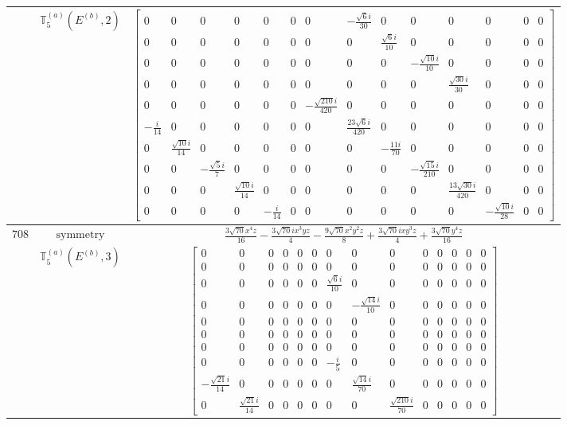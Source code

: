 \documentclass[fleqn,8pt,landscape]{jsarticle}
\begin{document}
\begin{longtable}{ccc}
$  $ & $ \mathbb{T}_{5}^{(a)}(E^{(b)},2) $ & $ \begin{bmatrix} 0 & 0 & 0 & 0 & 0 & 0 & 0 & - \frac{\sqrt{6} i}{30} & 0 & 0 & 0 & 0 & 0 & 0 \\ 0 & 0 & 0 & 0 & 0 & 0 & 0 & 0 & \frac{\sqrt{6} i}{10} & 0 & 0 & 0 & 0 & 0 \\ 0 & 0 & 0 & 0 & 0 & 0 & 0 & 0 & 0 & - \frac{\sqrt{10} i}{10} & 0 & 0 & 0 & 0 \\ 0 & 0 & 0 & 0 & 0 & 0 & 0 & 0 & 0 & 0 & \frac{\sqrt{30} i}{30} & 0 & 0 & 0 \\ 0 & 0 & 0 & 0 & 0 & 0 & - \frac{\sqrt{210} i}{420} & 0 & 0 & 0 & 0 & 0 & 0 & 0 \\ - \frac{i}{14} & 0 & 0 & 0 & 0 & 0 & 0 & \frac{23 \sqrt{6} i}{420} & 0 & 0 & 0 & 0 & 0 & 0 \\ 0 & \frac{\sqrt{10} i}{14} & 0 & 0 & 0 & 0 & 0 & 0 & - \frac{11 i}{70} & 0 & 0 & 0 & 0 & 0 \\ 0 & 0 & - \frac{\sqrt{5} i}{7} & 0 & 0 & 0 & 0 & 0 & 0 & - \frac{\sqrt{15} i}{210} & 0 & 0 & 0 & 0 \\ 0 & 0 & 0 & \frac{\sqrt{10} i}{14} & 0 & 0 & 0 & 0 & 0 & 0 & \frac{13 \sqrt{30} i}{420} & 0 & 0 & 0 \\ 0 & 0 & 0 & 0 & - \frac{i}{14} & 0 & 0 & 0 & 0 & 0 & 0 & - \frac{\sqrt{10} i}{28} & 0 & 0 \end{bmatrix} $ \\ \hline
$ 708 $ & $ \text{symmetry} $ & $ \frac{3 \sqrt{70} x^{4} z}{16} - \frac{3 \sqrt{70} i x^{3} y z}{4} - \frac{9 \sqrt{70} x^{2} y^{2} z}{8} + \frac{3 \sqrt{70} i x y^{3} z}{4} + \frac{3 \sqrt{70} y^{4} z}{16} $ \\
$  $ & $ \mathbb{T}_{5}^{(a)}(E^{(b)},3) $ & $ \begin{bmatrix} 0 & 0 & 0 & 0 & 0 & 0 & 0 & 0 & 0 & 0 & 0 & 0 & 0 & 0 \\ 0 & 0 & 0 & 0 & 0 & 0 & 0 & 0 & 0 & 0 & 0 & 0 & 0 & 0 \\ 0 & 0 & 0 & 0 & 0 & 0 & \frac{\sqrt{6} i}{10} & 0 & 0 & 0 & 0 & 0 & 0 & 0 \\ 0 & 0 & 0 & 0 & 0 & 0 & 0 & - \frac{\sqrt{14} i}{10} & 0 & 0 & 0 & 0 & 0 & 0 \\ 0 & 0 & 0 & 0 & 0 & 0 & 0 & 0 & 0 & 0 & 0 & 0 & 0 & 0 \\ 0 & 0 & 0 & 0 & 0 & 0 & 0 & 0 & 0 & 0 & 0 & 0 & 0 & 0 \\ 0 & 0 & 0 & 0 & 0 & 0 & 0 & 0 & 0 & 0 & 0 & 0 & 0 & 0 \\ 0 & 0 & 0 & 0 & 0 & 0 & - \frac{i}{5} & 0 & 0 & 0 & 0 & 0 & 0 & 0 \\ - \frac{\sqrt{21} i}{14} & 0 & 0 & 0 & 0 & 0 & 0 & \frac{\sqrt{14} i}{70} & 0 & 0 & 0 & 0 & 0 & 0 \\ 0 & \frac{\sqrt{21} i}{14} & 0 & 0 & 0 & 0 & 0 & 0 & \frac{\sqrt{210} i}{70} & 0 & 0 & 0 & 0 & 0 \end{bmatrix} $ \\ \hline

\end{longtable}
\end{document}
